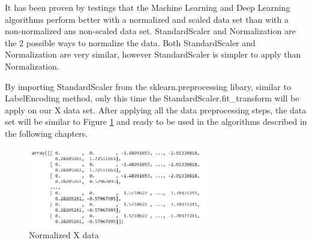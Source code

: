 It has been proven by testings that the Machine Learning and Deep Learning algorithms perform better with a normalized and scaled data set than with a non-normalized ans non-scaled data set. StandardScaler and Normalization are the 2 possible ways to normalize the data. Both StandardScaler and Normalization are very similar, however StandardScaler is simpler to apply than Normalization.

By importing StandardScaler from the  sklearn.preprocessing libary, similar to LabelEncoding method, only this time the StandardScaler.fit\_transform will be apply on our X data set. After applying all the data preprocessing steps, the data set will be similar to Figure \ref{fig:xtrain_data} and ready to be used in the algorithms described in the following chapters.


\begin{figure}[h]
    \centering
    \includegraphics[width=0.7\textwidth,height=0.17\textheight]{Chapters/Figures/standardScaler.png}
    \caption{Normalized X data}
    \label{fig:xtrain_data}
\end{figure}